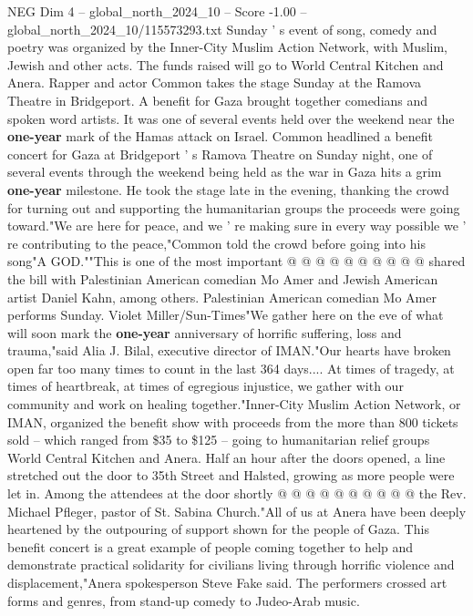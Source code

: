 \begin{textsample}{NEG Dim 4 – global\_north\_2024\_10 – Score -1.00 – global\_north\_2024\_10/115573293.txt}  \label{ex:f4_neg_052}
Sunday ' s event of song, comedy and poetry was organized by the Inner-City Muslim Action Network, with Muslim, Jewish and other acts.
The funds raised will go to World Central Kitchen and Anera.
Rapper and actor Common takes the stage Sunday at the Ramova Theatre in Bridgeport.
A benefit for Gaza brought together comedians and spoken word artists.
It was one of several events held over the weekend near the \textbf{one-year} mark of the Hamas attack on Israel.
Common headlined a benefit concert for Gaza at Bridgeport ' s Ramova Theatre on Sunday night, one of several events through the weekend being held as the war in Gaza hits a grim \textbf{one-year} milestone.
He took the stage late in the evening, thanking the crowd for turning out and supporting the humanitarian groups the proceeds were going toward."We are here for peace, and we ' re making sure in every way possible we ' re contributing to the peace,"Common told the crowd before going into his song"A GOD.""This is one of the most important @ @ @ @ @ @ @ @ @ @ shared the bill with Palestinian American comedian Mo Amer and Jewish American artist Daniel Kahn, among others.
Palestinian American comedian Mo Amer performs Sunday.
Violet Miller/Sun-Times"We gather here on the eve of what will soon mark the \textbf{one-year} anniversary of horrific suffering, loss and trauma,"said Alia J.
Bilal, executive director of IMAN."Our hearts have broken open far too many times to count in the last 364 days....
At times of tragedy, at times of heartbreak, at times of egregious injustice, we gather with our community and work on healing together."Inner-City Muslim Action Network, or IMAN, organized the benefit show with proceeds from the more than 800 tickets sold -- which ranged from \$35 to \$125 -- going to humanitarian relief groups World Central Kitchen and Anera.
Half an hour after the doors opened, a line stretched out the door to 35th Street and Halsted, growing as more people were let in.
Among the attendees at the door shortly @ @ @ @ @ @ @ @ @ @ the Rev.
Michael Pfleger, pastor of St.
Sabina Church."All of us at Anera have been deeply heartened by the outpouring of support shown for the people of Gaza.
This benefit concert is a great example of people coming together to help and demonstrate practical solidarity for civilians living through horrific violence and displacement,"Anera spokesperson Steve Fake said.
The performers crossed art forms and genres, from stand-up comedy to Judeo-Arab music.

\end{textsample}
